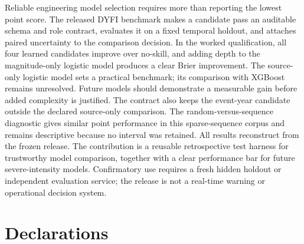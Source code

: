 \documentclass[pdflatex,sn-basic,Numbered]{sn-jnl}
\begin{document}
Reliable engineering model selection requires more than reporting the lowest
point score. The released DYFI benchmark makes a candidate pass an auditable
schema and role contract, evaluates it on a fixed temporal holdout, and attaches
paired uncertainty to the comparison decision. In the worked qualification, all
four learned candidates improve over no-skill, and adding depth to the
magnitude-only logistic model produces a clear Brier improvement. The
source-only logistic model sets a practical benchmark; its comparison with
XGBoost remains unresolved. Future models should demonstrate a measurable gain
before added complexity is justified. The contract also keeps the event-year
candidate outside the declared source-only comparison. The
random-versus-sequence diagnostic gives similar point performance in this
sparse-sequence corpus and remains descriptive because no interval was
retained. All results reconstruct from the frozen release. The contribution is a reusable
retrospective test harness for trustworthy model comparison, together with a
clear performance bar for future severe-intensity models. Confirmatory use
requires a fresh hidden holdout or independent evaluation service; the release
is not a real-time warning or operational decision system.

\backmatter

\section*{Declarations}
\end{document}

